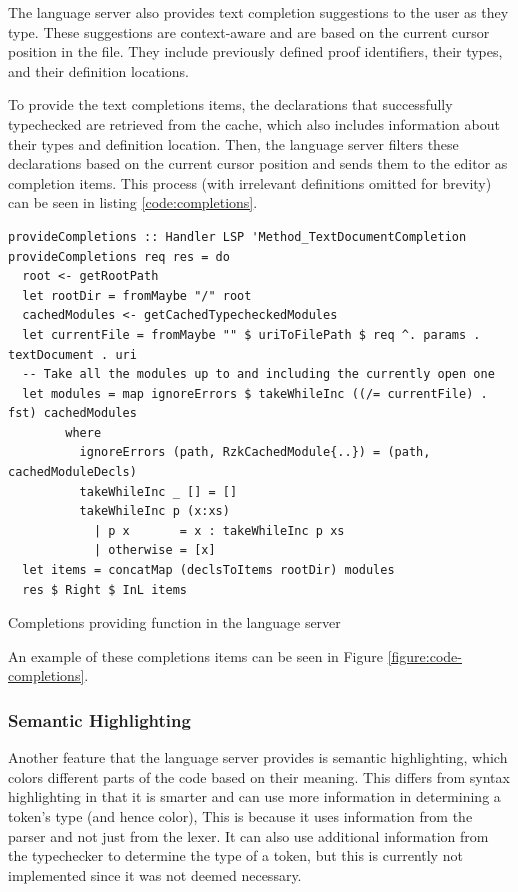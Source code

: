 The language server also provides text completion suggestions to the user as they type.
These suggestions are context-aware and are based on the current cursor position in the file.
They include previously defined proof identifiers, their types, and their definition locations.

To provide the text completions items, the declarations that successfully typechecked are
retrieved from the cache, which also includes information about their types and definition location.
Then, the language server filters these declarations based on the current cursor position
and sends them to the editor as completion items.
This process (with irrelevant definitions omitted for brevity) can be seen in listing \ref{code:completions}.

\begin{listing}
  \begin{verbatim}
provideCompletions :: Handler LSP 'Method_TextDocumentCompletion
provideCompletions req res = do
  root <- getRootPath
  let rootDir = fromMaybe "/" root
  cachedModules <- getCachedTypecheckedModules
  let currentFile = fromMaybe "" $ uriToFilePath $ req ^. params . textDocument . uri
  -- Take all the modules up to and including the currently open one
  let modules = map ignoreErrors $ takeWhileInc ((/= currentFile) . fst) cachedModules
        where
          ignoreErrors (path, RzkCachedModule{..}) = (path, cachedModuleDecls)
          takeWhileInc _ [] = []
          takeWhileInc p (x:xs)
            | p x       = x : takeWhileInc p xs
            | otherwise = [x]
  let items = concatMap (declsToItems rootDir) modules
  res $ Right $ InL items
  \end{verbatim}
  \caption{Completions providing function in the language server}
  \label{code:completions}
\end{listing}

An example of these completions items can be seen in Figure \ref{figure:code-completions}.

\subsubsection{Semantic Highlighting}

Another feature that the language server provides is semantic highlighting, which colors different parts of the code
based on their meaning.
This differs from syntax highlighting in that it is smarter and can use more information in determining a token's type (and hence color),
This is because it uses information from the parser and not just from the lexer.
It can also use additional information from the typechecker to determine the type of a token,
but this is currently not implemented since it was not deemed necessary.


